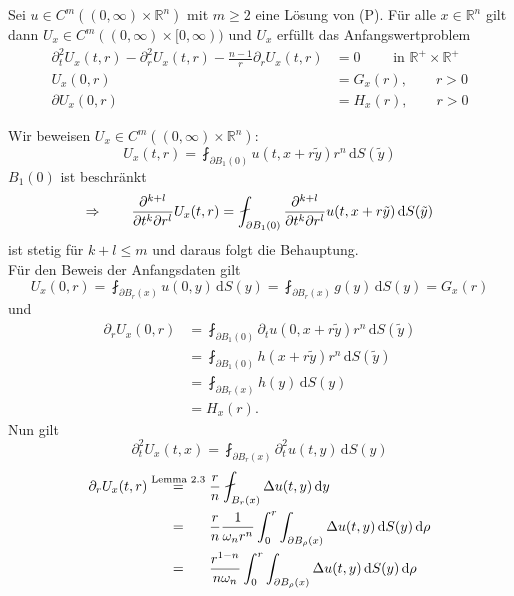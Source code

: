 \begin{lemma}
	Sei $u \in C^m((0,\infty) \times \mathbb{R}^n)$ mit $m \geq 2$ eine Lösung von (P). Für alle $ x \in \mathbb{R}^n$ gilt dann $U_x \in C^m((0,\infty) \times [0,\infty))$ und $U_x$ erfüllt das Anfangswertproblem 
	\begin{align*}
		\partial_t^2 U_x(t,r)- \partial_r^2 U_x(t,r) - \frac{n-1}{r} \partial_r U_x(t,r) &= 0 \qquad \text{ in } \mathbb{R}^{+} \times \mathbb{R}^{+} \\
		U_x(0,r)&= G_x(r), \qquad r>0 \\
		\partial U_x(0,r) &= H_x(r), \qquad r>0
	\end{align*}
\end{lemma}
\begin{beweis}
Wir beweisen $U_x \in C^m((0,\infty) \times \mathbb{R}^n)$:
\[
	U_x(t,r) = \fint_{\partial B_1(0)}^{} u (t,x+r \tilde y)r^n \,\mathrm{d}S(\tilde y)
\]	
$B_1(0)$ ist beschränkt
\[
	\Rightarrow \qquad \diff{^{k+l}}{t^k \partial r^l} U_x(t,r) = \fint_{\partial B_1(0)}^{} \diff{^{k+l}}{t^k \partial r^l} u(t,x+r \tilde y) \,\mathrm{d}S(\tilde y)
\]
ist stetig für $k+l \leq m$ und daraus folgt die Behauptung. \\ 
Für den Beweis der Anfangsdaten gilt
\[
	U_x(0,r) = \fint_{\partial B_r(x)}^{} u(0,y) \,\mathrm{d}S(y) = \fint_{\partial B_r(x)}^{} g(y) \,\mathrm{d}S(y) = G_x(r)
\]
und
\begin{align*}
	\partial_r U_x(0,r)& = \fint_{\partial B_1(0)}^{} \partial_t u(0,x+ r \tilde y) r^n \,\mathrm{d}S(\tilde y) \\ &= 
	\fint_{\partial B_1(0)}^{} h(x+ r \tilde y)r^n \,\mathrm{d}S(\tilde y) \\ &= \fint_{\partial B_r(x)}^{} h(y) \,\mathrm{d}S(y) \\ &= H_x(r).
\end{align*}
Nun gilt
\[
	\partial_t^2U_x(t,x) = \fint_{\partial B_r(x)}^{} \partial_t^2 u(t,y) \,\mathrm{d}S(y)
\]
\begin{align*}
	\partial_r U_x(t,r) &\stackrel{\text{Lemma }2.3}{=} \frac{r}{n} \fint_{B_r(x)}^{} \Delta u(t,y) \,\mathrm{d}y \\
	& \stackrel{\hphantom{\text{Lemma }2.3}}{=} \frac{r}{n} \frac{1}{\omega_n r^n} \int_{0}^{r} \int_{\partial B_{\rho}(x)}^{} \Delta u(t,y) \,\mathrm{d}S(y) \,\mathrm{d}\rho \\
	& \stackrel{\hphantom{\text{Lemma }2.3}}{=} \frac{r^{1-n}}{n \omega_n} \int_{0}^{r} \int_{\partial B_{\rho}(x)}^{} \Delta u(t,y) \,\mathrm{d}S(y) \,\mathrm{d}\rho
\end{align*}


\end{beweis}
